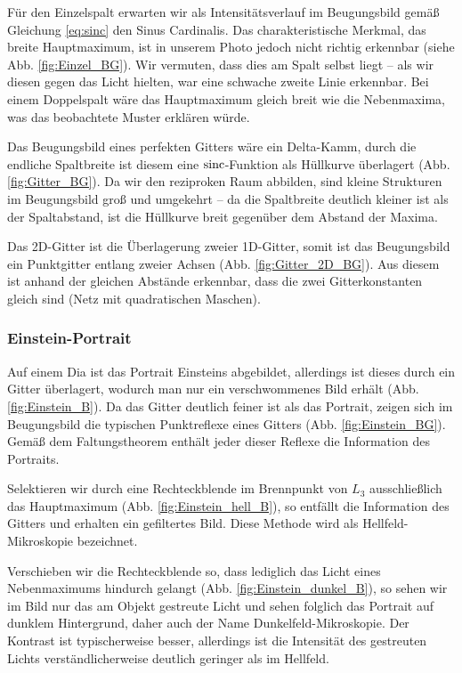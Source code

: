 Für den Einzelspalt erwarten wir als Intensitätsverlauf im Beugungsbild gemäß Gleichung \eqref{eq:sinc} den Sinus Cardinalis. Das charakteristische Merkmal, das breite Hauptmaximum, ist in unserem Photo jedoch nicht richtig erkennbar (siehe Abb. \ref{fig:Einzel_BG}). Wir vermuten, dass dies am Spalt selbst liegt -- als wir diesen gegen das Licht hielten, war eine schwache zweite Linie erkennbar. Bei einem Doppelspalt wäre das Hauptmaximum gleich breit wie die Nebenmaxima, was das beobachtete Muster erklären würde.

Das Beugungsbild eines perfekten Gitters wäre ein Delta-Kamm, durch die endliche Spaltbreite ist diesem eine $\operatorname{sinc}$-Funktion als Hüllkurve überlagert (Abb. \ref{fig:Gitter_BG}). Da wir den reziproken Raum abbilden, sind kleine Strukturen im Beugungsbild groß und umgekehrt -- da die Spaltbreite deutlich kleiner ist als der Spaltabstand, ist die Hüllkurve breit gegenüber dem Abstand der Maxima.

Das 2D-Gitter ist die Überlagerung zweier 1D-Gitter, somit ist das Beugungsbild ein Punktgitter entlang zweier Achsen (Abb. \ref{fig:Gitter_2D_BG}). Aus diesem ist anhand der gleichen Abstände erkennbar, dass die zwei Gitterkonstanten gleich sind (Netz mit quadratischen Maschen).


\newpage
\subsubsection{Einstein-Portrait}
Auf einem Dia ist das Portrait Einsteins abgebildet, allerdings ist dieses durch ein Gitter überlagert, wodurch man nur ein verschwommenes Bild erhält (Abb. \ref{fig:Einstein_B}). Da das Gitter deutlich feiner ist als das Portrait, zeigen sich im Beugungsbild die typischen Punktreflexe eines Gitters (Abb. \ref{fig:Einstein_BG}). Gemäß dem Faltungstheorem enthält jeder dieser Reflexe die Information des Portraits.

Selektieren wir durch eine Rechteckblende im Brennpunkt von $L_3$ ausschließlich das Hauptmaximum (Abb. \ref{fig:Einstein_hell_B}), so entfällt die Information des Gitters und erhalten ein gefiltertes Bild. Diese Methode wird als Hellfeld-Mikroskopie bezeichnet.

Verschieben wir die Rechteckblende so, dass lediglich das Licht eines Nebenmaximums hindurch gelangt (Abb. \ref{fig:Einstein_dunkel_B}), so sehen wir im Bild nur das am Objekt gestreute Licht und sehen folglich das Portrait auf dunklem Hintergrund, daher auch der Name Dunkelfeld-Mikroskopie. Der Kontrast ist typischerweise besser, allerdings ist die Intensität des gestreuten Lichts verständlicherweise deutlich geringer als im Hellfeld.

